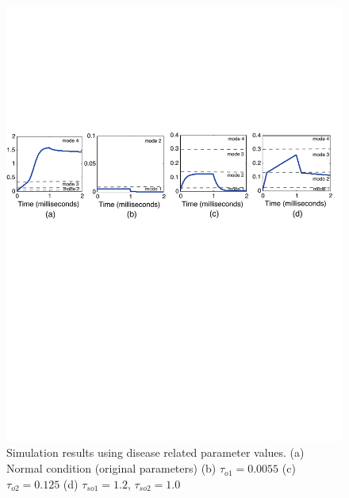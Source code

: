 \begin{figure}[h]
\centering
\includegraphics[scale=0.58]{fig-cardiactraj2}
\caption{Simulation results using disease related parameter values. (a) Normal condition (original parameters) (b) $\tau_{o1}=0.0055$ (c) $\tau_{o2} = 0.125$ (d) $\tau_{so1} =1.2$, $\tau_{so2} =1.0$ }
\label{cresults}
\end{figure}




